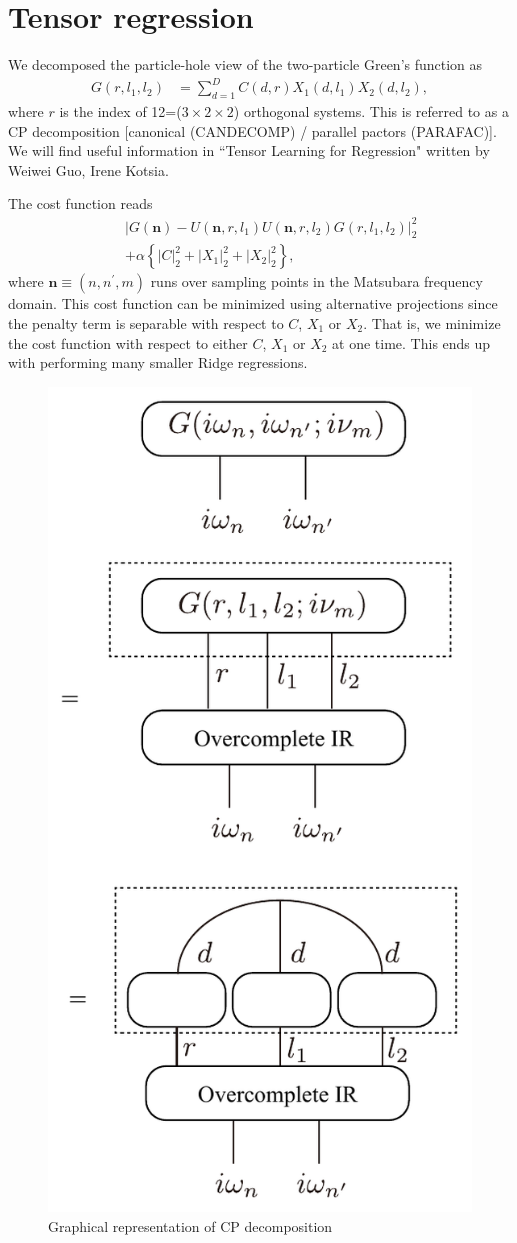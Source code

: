 \documentclass[prb,twocolumn,superscriptaddress]{revtex4-1}
\begin{document}
\fi

\section{Tensor regression}
We decomposed the particle-hole view of the two-particle Green's function as
\begin{align}
G(r, l_1, l_2) &= \sum_{d=1}^D C(d, r) X_1(d,l_1) X_2(d,l_2),
\end{align}
where $r$ is the index of 12=($3\times 2\times 2$) orthogonal systems.
This is referred to as a CP decomposition [canonical (CANDECOMP) / parallel pactors (PARAFAC)].
We will find useful information in ``Tensor Learning for Regression" written by Weiwei Guo, Irene Kotsia.

The cost function reads
\begin{align}
&& |G(\boldsymbol{n}) - U(\boldsymbol{n}, r, l_1) U(\boldsymbol{n}, r, l_2) G(r, l_1, l_2)|^2_2 \nonumber \\
&& + \alpha \left\{ |C|^2_2 + |X_1|^2_2 + |X_2|^2_2 \right\},
\end{align}
where $\boldsymbol{n} \equiv (n, n^\prime, m)$ runs over sampling points in the Matsubara frequency domain.
This cost function can be minimized using alternative projections since the penalty term is separable with respect to $C$, $X_1$ or $X_2$.
That is, we minimize the cost function with respect to either $C$, $X_1$ or $X_2$ at one time.
This ends up with performing many smaller Ridge regressions.

\begin{figure}
	\centering\includegraphics[width=.4\textwidth,clip]{tensor_regression.pdf}
	\caption{
		Graphical representation of CP decomposition
	}
	\label{fig:CP}
\end{figure}
\end{document}
